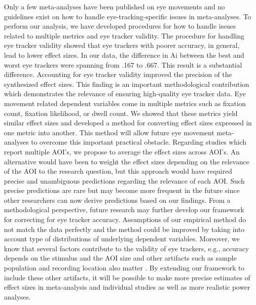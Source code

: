 \documentclass[english,natbib,man,floatsintext]{apa6}
\begin{document}
Only a few meta-analyses have been published on eye movements and no guidelines exist on how to handle eye-tracking-specific issues in meta-analyses. To perform our analysis, we have developed procedures for how to handle issues related to multiple metrics and eye tracker validity. The procedure for handling eye tracker validity showed that eye trackers with poorer accuracy, in general, lead to lower effect sizes. In our data, the difference in Ai between the best and worst eye trackers were spanning from .167 to .667. This result is a substantial difference. Accounting for eye tracker validity improved the precision of the synthesized effect sizes. This finding is an important methodological contribution which demonstrates the relevance of ensuring high-quality eye tracker data. Eye movement related dependent variables come in multiple metrics such as fixation count, fixation likelihood, or dwell count. We showed that these metrics yield similar effect sizes and developed a method for converting effect sizes expressed in one metric into another. This method will allow future eye movement meta-analyses to overcome this important practical obstacle. Regarding studies which report multiple AOI's, we propose to average the effect sizes across AOI's. An alternative would have been to weight the effect sizes depending on the relevance of the AOI to the research question, but this approach would have required precise and unambiguous predictions regarding the relevance of each AOI. Such precise predictions are rare but may become more frequent in the future since other researchers can now derive predictions based on our findings. From a methodological perspective, future research may further develop our framework for correcting for eye tracker accuracy. Assumptions of our empirical method do not match the data perfectly and the method could be improved by taking into account type of distributions of underlying dependent variables. Moreover, we know that several factors contribute to the validity of eye trackers, e.g., accuracy depends on the stimulus and the AOI size \citep{orquin2018a} and other artifacts such as sample population and recording location also matter \citep{nystroem2013a}. By extending our framework to include these other artifacts, it will be possible to make more precise estimates of effect sizes in meta-analysis and individual studies as well as more realistic power analyses.   
\end{document}
